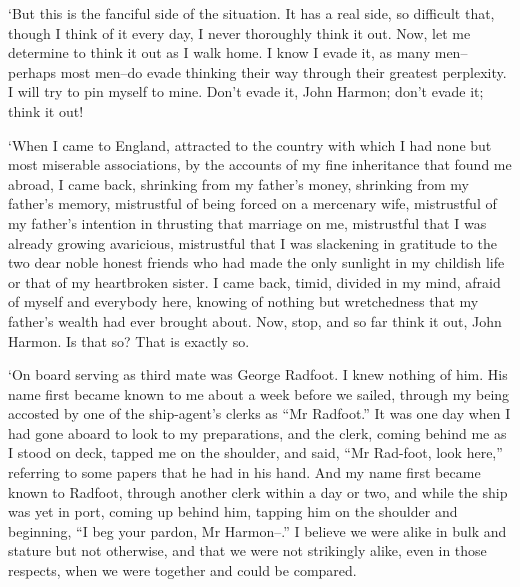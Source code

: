 ‘But this is the fanciful side of the situation. It has a real side, so
difficult that, though I think of it every day, I never thoroughly think
it out. Now, let me determine to think it out as I walk home. I know
I evade it, as many men--perhaps most men--do evade thinking their way
through their greatest perplexity. I will try to pin myself to mine.
Don’t evade it, John Harmon; don’t evade it; think it out!


‘When I came to England, attracted to the country with which I had none
but most miserable associations, by the accounts of my fine inheritance
that found me abroad, I came back, shrinking from my father’s money,
shrinking from my father’s memory, mistrustful of being forced on a
mercenary wife, mistrustful of my father’s intention in thrusting that
marriage on me, mistrustful that I was already growing avaricious,
mistrustful that I was slackening in gratitude to the two dear noble
honest friends who had made the only sunlight in my childish life or
that of my heartbroken sister. I came back, timid, divided in my mind,
afraid of myself and everybody here, knowing of nothing but wretchedness
that my father’s wealth had ever brought about. Now, stop, and so far
think it out, John Harmon. Is that so? That is exactly so.

‘On board serving as third mate was George Radfoot. I knew nothing of
him. His name first became known to me about a week before we sailed,
through my being accosted by one of the ship-agent’s clerks as
“Mr Radfoot.” It was one day when I had gone aboard to look to my
preparations, and the clerk, coming behind me as I stood on deck, tapped
me on the shoulder, and said, “Mr Rad-foot, look here,” referring to
some papers that he had in his hand. And my name first became known to
Radfoot, through another clerk within a day or two, and while the ship
was yet in port, coming up behind him, tapping him on the shoulder and
beginning, “I beg your pardon, Mr Harmon--.” I believe we were alike
in bulk and stature but not otherwise, and that we were not strikingly
alike, even in those respects, when we were together and could be
compared.

